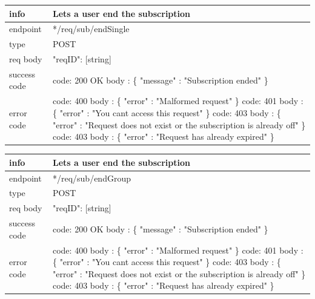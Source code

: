 \documentclass[titlepage]{article}
\begin{document}
	\begin{tabularx}{\textwidth}{lX} \hline
		info & Lets a user end the subscription \\ \hline
		endpoint & */req/sub/endSingle \\ \hline
		type & POST \\ \hline
		req body & 
		"reqID": [string] \\ \hline
		success code &
		code: 200 OK \newline  
		body : \{ \newline
		"message" : "Subscription ended" \newline
		\} \\ \hline
		error code &
		code: 400 \newline
		body : \{ "error" : "Malformed request" \} \newline \newline
		code: 401 \newline
		body : \{ "error" : "You can\textsc{\char13}t access this request" \} \newline \newline
		code: 403 \newline
		body : \{ "error" : "Request does not exist or the subscription is already off" \} \newline \newline
		code: 403 \newline
		body : \{ "error" : "Request has already expired" \}\\ \hline
	\end{tabularx}
	
	\vspace{\baselineskip}
	
	\begin{tabularx}{\textwidth}{lX} \hline
		info & Lets a user end the subscription \\ \hline
		endpoint & */req/sub/endGroup \\ \hline
		type & POST \\ \hline
		req body & 
		"reqID": [string] \\ \hline
		success code &
		code: 200 OK \newline  
		body : \{ \newline
		"message" : "Subscription ended" \newline
		\} \\ \hline
		error code &
		code: 400 \newline
		body : \{ "error" : "Malformed request" \} \newline \newline
		code: 401 \newline
		body : \{ "error" : "You can\textsc{\char13}t access this request" \} \newline \newline
		code: 403 \newline
		body : \{ "error" : "Request does not exist or the subscription is already off" \} \newline \newline
		code: 403 \newline
		body : \{ "error" : "Request has already expired" \}\\ \hline
	\end{tabularx}
	
\end{document}
